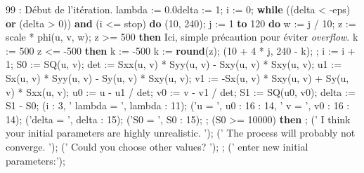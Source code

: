 {{{  \medskip 
  \filbreak 
 
  99 :   \hfill {\eightpoint D\'ebut de l'it\'eration.  } \hfill  
\smallskip 
  lambda := 0.0\iB  delta := 1; 
  i := 0; 
\smallskip 
  {\bf while} ((delta < -eps) {\bf or} (delta > 0)) {\bf and} %
(i <= stop) {\bf do}  
\smallskip 
\smallskip 
    (10, 240); 
\smallskip 
\vskip-12pt 
  j := 1 {\bf to} 120 {\bf do} 
      \iB w := j / 10; 
      \iB z := scale * phi(u, v, w); 
       z >= 500 {\bf then} \hfill %
{\eightpoint Ici, simple pr\'ecaution pour \'eviter {\it overflow}.  } 
      \iB k := 500 
       z <= -500 {\bf then} 
      \iB k := -500 
      \iB k := {\bf round}(z); 
      (10 + 4 * j, 240 - k); 
      ; 
\smallskip 
  \filbreak 
\vskip-12pt 
  \iA i := i + 1; 
   \iA S0 := SQ(u, v); 
   \iA det := Sxx(u, v) * Syy(u, v) - Sxy(u, v) * Sxy(u, v); 
   \iA u1 := Sx(u, v) * Syy(u, v) - Sy(u, v) * Sxy(u, v); 
   \iA v1 := -Sx(u, v) * Sxy(u, v) + Sy(u, v) * Sxx(u, v); 
   \iA u0 := u - u1 / det; 
   \iA v0 := v - v1 / det; 
   \iA S1 := SQ(u0, v0); 
   \iA delta := S1 - S0; 
  \filbreak 
   (i : 3, '   lambda = ', lambda : 11); 
   ('u = ', u0 : 16 : 14, ' v = ', v0 : 16 : 14); 
   ('delta = ', delta : 15); 
   ('S0 = ', S0 : 15); 
   ; 
\smallskip 
  \filbreak 
\vskip-12pt 
    (S0 >= 10000) {\bf then} 
\smallskip 
\smallskip 
      ; 
      ('    I think your initial parameters are highly 
      \iB unrealistic. '); 
      ('    The process will probably not converge. '); 
      ('    Could you choose other values? '); 
      ; 
      ('   enter new initial parameters:'); 
}}}
